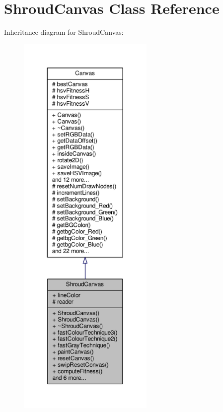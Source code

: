 \hypertarget{classShroudCanvas}{}\section{Shroud\+Canvas Class Reference}
\label{classShroudCanvas}


Inheritance diagram for Shroud\+Canvas\+:
\nopagebreak
\begin{figure}[H]
\begin{center}
\leavevmode
\includegraphics[height=550pt]{classShroudCanvas__inherit__graph}
\end{center}
\end{figure}


